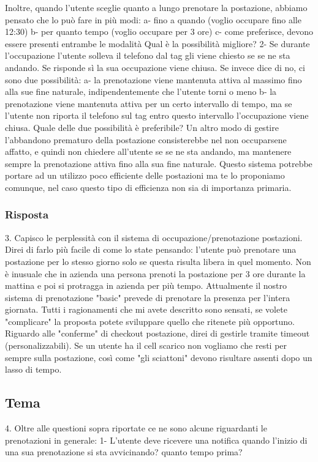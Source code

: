Inoltre, quando l'utente sceglie quanto a lungo prenotare la postazione, abbiamo pensato che lo può fare in più modi:
a- fino a quando (voglio occupare fino alle 12:30)
b- per quanto tempo (voglio occupare per 3 ore)
c- come preferisce, devono essere presenti entrambe le modalità
Qual è la possibilità migliore?
2- Se durante l'occupazione l'utente solleva il telefono dal tag gli viene chiesto se se ne sta andando. Se risponde sì la sua occupazione viene chiusa. Se invece dice di no, ci sono due possibilità:
a- la prenotazione viene mantenuta attiva al massimo fino alla sue fine naturale, indipendentemente che l'utente torni o meno
b- la prenotazione viene mantenuta attiva per un certo intervallo di tempo, ma se l'utente non riporta il telefono sul tag entro questo intervallo l'occupazione viene chiusa.
Quale delle due possibilità è preferibile?
Un altro modo di gestire l'abbandono prematuro della postazione consisterebbe nel non occuparsene affatto, e quindi non chiedere all'utente se se ne sta andando, ma mantenere sempre la prenotazione attiva fino alla sua fine naturale. Questo sistema potrebbe portare ad un utilizzo poco efficiente delle postazioni ma te lo proponiamo comunque, nel caso questo tipo di efficienza non sia di importanza primaria.
\subsubsection{Risposta}
3. Capisco le perplessità con il sistema di occupazione/prenotazione postazioni. Direi di farlo più facile di come lo state pensando: l'utente può prenotare una postazione per lo stesso giorno solo se questa risulta libera in quel momento. Non è inusuale che in azienda una persona prenoti la postazione per 3 ore durante la mattina e poi si protragga in azienda per più tempo. Attualmente il nostro sistema di prenotazione "basic" prevede di prenotare la presenza per l'intera giornata. Tutti i ragionamenti che mi avete descritto sono sensati, se volete "complicare" la proposta potete sviluppare quello che ritenete più opportuno. Riguardo alle "conferme" di checkout postazione, direi di gestirle tramite timeout (personalizzabili). Se un utente ha il cell scarico non vogliamo che resti per sempre sulla postazione, così come "gli sciattoni" devono risultare assenti dopo un lasso di tempo.

\subsection*{Tema}
4. Oltre alle questioni sopra riportate ce ne sono alcune riguardanti le prenotazioni in generale:
1- L'utente deve ricevere una notifica quando l'inizio di una sua prenotazione si sta avvicinando? quanto tempo prima?
